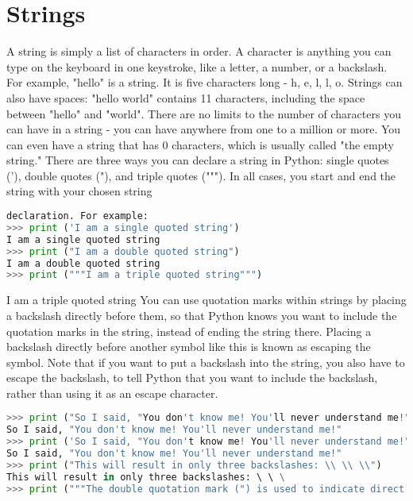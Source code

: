 \section{Strings}
A string is simply a list of characters in order. A character is anything you
can type on the keyboard in one keystroke, like a letter, a number, or a
backslash. For example, "hello" is a string. It is five characters long
- h, e, l, l, o. Strings can also have spaces: "hello world" contains 11
characters, including the space between "hello" and "world". There are no limits
to the number of characters you can have in a string - you can have
anywhere from one to a million or more. You can even have a string that has 0
characters, which is usually called "the empty string." There are three ways you
can declare a string in Python: single quotes ('), double quotes ("), and triple
quotes ("""). In all cases, you start and end the string with your chosen string
\lstset{basicstyle=\scriptsize, numbers=left, captionpos=b, tabsize=4}
\begin{lstlisting}[caption=String 1,language={Python},
xleftmargin=15pt, label=lst:string1]
declaration. For example:
>>> print ('I am a single quoted string')
I am a single quoted string
>>> print ("I am a double quoted string")
I am a double quoted string
>>> print ("""I am a triple quoted string""")
\end{lstlisting}

I am a triple quoted string You can use quotation marks within strings by
placing a backslash directly before them, so that Python knows you want to
include the quotation marks in the string, instead of ending the string there.
Placing a backslash directly before another symbol like this is known as
escaping the symbol. Note that if you want to put a backslash into the string,
you also have to escape the backslash, to tell Python that you want to include
the backslash, rather than using it as an escape character.
\lstset{basicstyle=\scriptsize, numbers=left,breaklines=true, captionpos=b, tabsize=4}
\begin{lstlisting}[caption=String 2,language={Python},
xleftmargin=15pt, label=lst:string2]
>>> print ("So I said, "You don't know me! You'll never understand me!"")
So I said, "You don't know me! You'll never understand me!"
>>> print ('So I said, "You don't know me! You'll never understand me!"')
So I said, "You don't know me! You'll never understand me!"
>>> print ("This will result in only three backslashes: \\ \\ \\")
This will result in only three backslashes: \ \ \
>>> print ("""The double quotation mark (") is used to indicate direct quotations.""")
\end{lstlisting}

